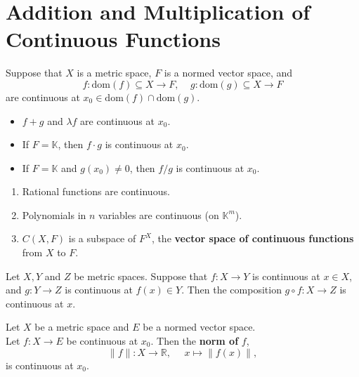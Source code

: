 \section{Addition and Multiplication of Continuous Functions}
\begin{proposition}
    Suppose that \(X\) is a metric space, \(F\) is a normed vector space, and 
    \[
        f \colon \text{dom}(f) \subseteq X \to F, \:\:\:\:\: 
        g \colon \text{dom}(g) \subseteq X \to F 
    \]
    are continuous at \(x_0 \in \text{dom}\left(f\right) \cap \text{dom}\left(g\right)\). 

    \begin{itemize}
        \item \(f + g\) and \(\lambda f\) are continuous at \(x_0\). 
        \item If \(F = \mathbb{K}\), then \(f \cdot g\) is continuous at \(x_0\). 
        \item If \(F = \mathbb{K}\) and \(g\left(x_0\right) \neq 0\), then 
        \(f / g\) is continuous at \(x_0\). 
    \end{itemize}
\end{proposition}

\begin{corollary}
    \begin{enumerate}[label=(\roman*)]
        \item Rational functions are continuous. 
        \item Polynomials in \(n\) variables are continuous (on \(\mathbb{K}^m\)). 
        \item \(C\left(X, F\right)\) is a subspace of \(F^X\), the \textbf{vector space
        of continuous functions} from \(X\) to \(F\). 
    \end{enumerate}
\end{corollary}

\begin{theorem}
    Let \(X, Y\) and \(Z\) be metric spaces. Suppose that \(f \colon X \to Y\) is 
    continuous at \(x \in X\), and \(g \colon Y \to Z\) is continuous at 
    \(f\left(x\right) \in Y\). Then the composition \(g \circ f \colon X \to Z\)
    is continuous at \(x\). 
\end{theorem}

\begin{eg}
    Let \(X\) be a metric space and \(E\) be a normed vector space. \\ 
   
    Let \(f \colon X \to E\) be continuous at \(x_0\). Then the \textbf{norm of } \(f\),
    \[
        \lVert f \rVert \colon X \to \mathbb{R}, \:\:\:\:\:\: x \mapsto \lVert f(x) \rVert ,
    \]
    is continuous at \(x_0\). 
\end{eg}

